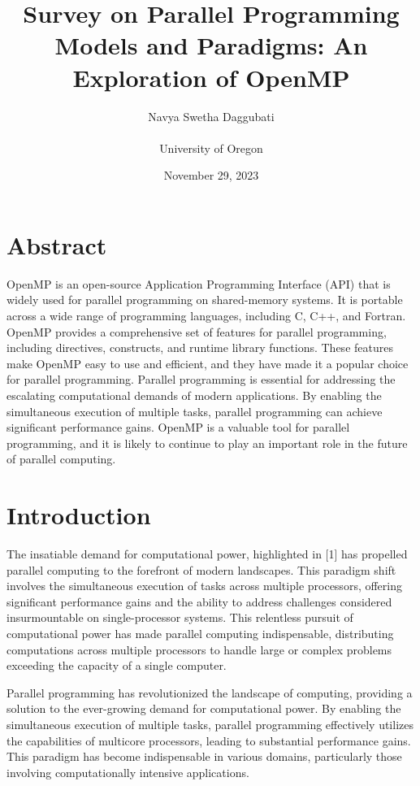 \documentclass[12pt,conference]{IEEEtran}
\title{Survey on Parallel Programming Models and Paradigms: An Exploration of OpenMP}
\author{Navya Swetha Daggubati \\ \\ University of Oregon}
\date{November 29, 2023}
\begin{document}
\maketitle

\section{Abstract}

OpenMP is an open-source Application Programming Interface (API) that is widely used for parallel programming on shared-memory systems. It is portable across a wide range of programming languages, including C, C++, and Fortran. OpenMP provides a comprehensive set of features for parallel programming, including directives, constructs, and runtime library functions. These features make OpenMP easy to use and efficient, and they have made it a popular choice for parallel programming. Parallel programming is essential for addressing the escalating computational demands of modern applications. By enabling the simultaneous execution of multiple tasks, parallel programming can achieve significant performance gains. OpenMP is a valuable tool for parallel programming, and it is likely to continue to play an important role in the future of parallel computing.

\section{Introduction}

The insatiable demand for computational power, highlighted in [1] has propelled parallel computing to the forefront of modern landscapes. This paradigm shift involves the simultaneous execution of tasks across multiple processors, offering significant performance gains and the ability to address challenges considered insurmountable on single-processor systems. This relentless pursuit of computational power has made parallel computing indispensable, distributing computations across multiple processors to handle large or complex problems exceeding the capacity of a single computer.

Parallel programming has revolutionized the landscape of computing, providing a solution to the ever-growing demand for computational power. By enabling the simultaneous execution of multiple tasks, parallel programming effectively utilizes the capabilities of multicore processors, leading to substantial performance gains. This paradigm has become indispensable in various domains, particularly those involving computationally intensive applications.
\end{document}
